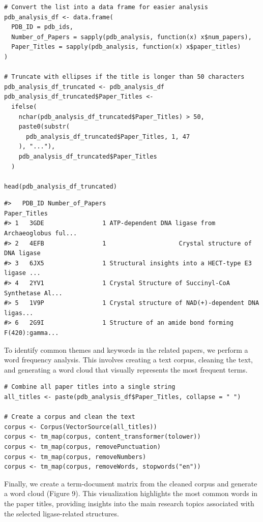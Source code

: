 \begin{verbatim}
# Convert the list into a data frame for easier analysis
pdb_analysis_df <- data.frame(
  PDB_ID = pdb_ids,
  Number_of_Papers = sapply(pdb_analysis, function(x) x$num_papers),
  Paper_Titles = sapply(pdb_analysis, function(x) x$paper_titles)
)

# Truncate with ellipses if the title is longer than 50 characters
pdb_analysis_df_truncated <- pdb_analysis_df
pdb_analysis_df_truncated$Paper_Titles <-
  ifelse(
    nchar(pdb_analysis_df_truncated$Paper_Titles) > 50,
    paste0(substr(
      pdb_analysis_df_truncated$Paper_Titles, 1, 47
    ), "..."),
    pdb_analysis_df_truncated$Paper_Titles
  )

head(pdb_analysis_df_truncated)  
\end{verbatim}

\begin{verbatim}
#>   PDB_ID Number_of_Papers                                       Paper_Titles
#> 1   3GDE                1 ATP-dependent DNA ligase from Archaeoglobus ful...
#> 2   4EFB                1                    Crystal structure of DNA ligase
#> 3   6JX5                1 Structural insights into a HECT-type E3 ligase ...
#> 4   2YV1                1 Crystal Structure of Succinyl-CoA Synthetase Al...
#> 5   1V9P                1 Crystal structure of NAD(+)-dependent DNA ligas...
#> 6   2G9I                1 Structure of an amide bond forming F(420):gamma...
\end{verbatim}

To identify common themes and keywords in the related papers, we perform a word frequency analysis. This involves creating a text corpus, cleaning the text, and generating a word cloud that visually represents the most frequent terms.

\begin{verbatim}
# Combine all paper titles into a single string
all_titles <- paste(pdb_analysis_df$Paper_Titles, collapse = " ")

# Create a corpus and clean the text
corpus <- Corpus(VectorSource(all_titles))
corpus <- tm_map(corpus, content_transformer(tolower))
corpus <- tm_map(corpus, removePunctuation)
corpus <- tm_map(corpus, removeNumbers)
corpus <- tm_map(corpus, removeWords, stopwords("en"))
\end{verbatim}

Finally, we create a term-document matrix from the cleaned corpus and generate a word cloud (Figure 9). This visualization highlights the most common words in the paper titles, providing insights into the main research topics associated with the selected ligase-related structures.


